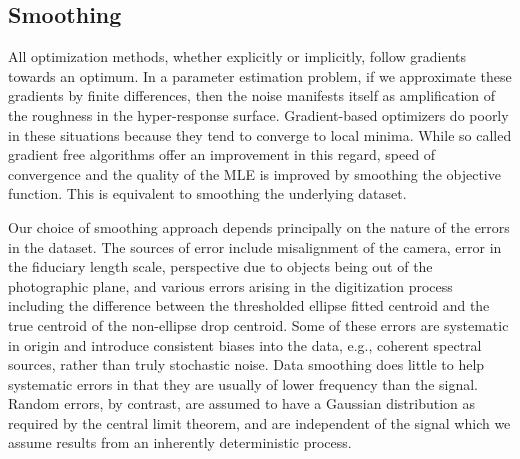 \documentclass[12pt,a4paper,oneside]{book}
\begin{document}
\subsection{Smoothing}
All optimization methods, whether explicitly or implicitly, follow gradients towards an optimum. In a parameter estimation problem, if we approximate these gradients by finite differences, then the noise manifests itself as amplification of the roughness in the hyper-response surface. Gradient-based optimizers do poorly in these situations because they tend to converge to local minima. While so called gradient free algorithms offer an improvement in this regard, speed of convergence and the quality of the MLE is improved by smoothing the objective function. This is equivalent to smoothing the underlying dataset.

Our choice of smoothing approach depends principally on the nature of the errors in the dataset. The sources of error include misalignment of the camera, error in the fiduciary length scale, perspective due to objects being out of the photographic plane, and various errors arising in the digitization process including the difference between the thresholded ellipse fitted centroid and the true centroid of the non-ellipse drop centroid. Some of these errors are systematic in origin and introduce consistent biases into the data, e.g., coherent spectral sources, rather than truly stochastic noise. Data smoothing does little to help systematic errors in that they are usually of lower frequency than the signal. Random errors, by contrast, are assumed to have a Gaussian distribution as required by the central limit theorem, and are independent of the signal which we assume results from an inherently deterministic process.
\end{document}
